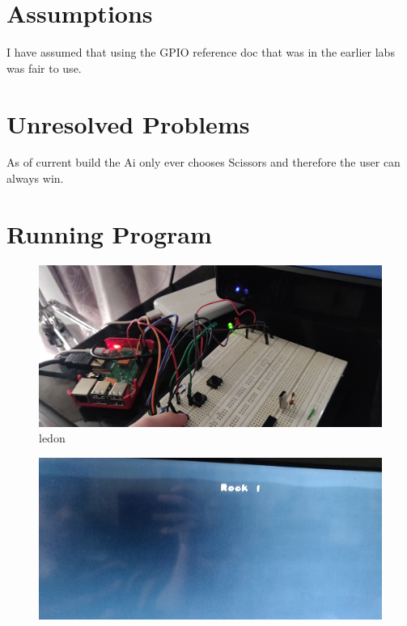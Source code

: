 \documentclass{article}
\begin{document}
\section*{Assumptions}
I have assumed that using the GPIO reference doc that was in the earlier labs was fair to use.

\section*{Unresolved Problems}
As of current build the Ai only ever chooses Scissors and therefore the user can always win.

\pagebreak
\section*{Running Program}
\begin{figure}[h]
    \centering
    \includegraphics[scale=0.08]{ledon.jpg}
    \caption{ledon}
\end{figure}
\begin{figure}[h]
    \centering
    \includegraphics[scale=0.08]{rock.jpg}
\end{figure}
\end{document}
